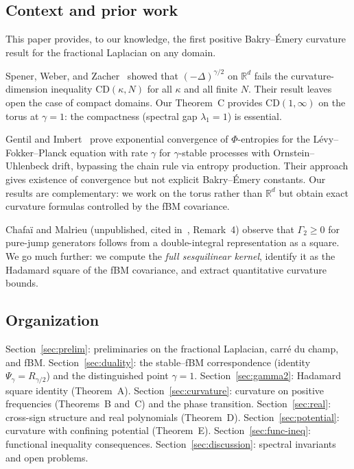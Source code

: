 \documentclass[11pt,a4paper]{article}
\theoremstyle{plain}
\theoremstyle{definition}
\theoremstyle{remark}
\newcommand{\R}{\mathbb{R}}
\begin{document}
\subsection{Context and prior work}

This paper provides, to our knowledge, the first positive
Bakry--\'Emery curvature result for the fractional Laplacian
on any domain.

Spener, Weber, and Zacher~\cite{SpenerWeberZacher2020} showed that
$(-\Delta)^{\gamma/2}$ on $\R^d$ fails the curvature-dimension inequality
$\mathrm{CD}(\kappa,N)$ for all $\kappa$ and all finite $N$. Their result
leaves open the case of compact domains. Our Theorem~C provides
$\mathrm{CD}(1,\infty)$ on the torus at $\gamma = 1$: the compactness
(spectral gap $\lambda_1 = 1$) is essential.

Gentil and Imbert~\cite{GentilImbert2008} prove exponential convergence
of $\Phi$-entropies for the L\'evy--Fokker--Planck equation with rate
$\gamma$ for $\gamma$-stable processes with Ornstein--Uhlenbeck drift,
bypassing the chain rule via entropy production. Their approach gives
existence of convergence but not explicit Bakry--\'Emery constants.
Our results are complementary: we work on the torus rather than $\R^d$
but obtain exact curvature formulas controlled by the fBM covariance.

Chafa\"i and Malrieu (unpublished, cited in~\cite{GentilImbert2008},
Remark~4) observe that $\Gamma_2 \geq 0$ for pure-jump generators
follows from a double-integral representation as a square. We go
much further: we compute the \emph{full sesquilinear kernel}, identify
it as the Hadamard square of the fBM covariance, and extract
quantitative curvature bounds.


\subsection{Organization}

Section~\ref{sec:prelim}: preliminaries on the fractional Laplacian,
carr\'e du champ, and fBM.
Section~\ref{sec:duality}: the stable--fBM correspondence (identity
$\Psi_\gamma = R_{\gamma/2}$) and the distinguished point $\gamma = 1$.
Section~\ref{sec:gamma2}: Hadamard square identity (Theorem~A).
Section~\ref{sec:curvature}: curvature on positive frequencies
(Theorems~B and~C) and the phase transition.
Section~\ref{sec:real}: cross-sign structure and real polynomials
(Theorem~D).
Section~\ref{sec:potential}: curvature with confining potential
(Theorem~E).
Section~\ref{sec:func-ineq}: functional inequality consequences.
Section~\ref{sec:discussion}: spectral invariants and open problems.
\end{document}
